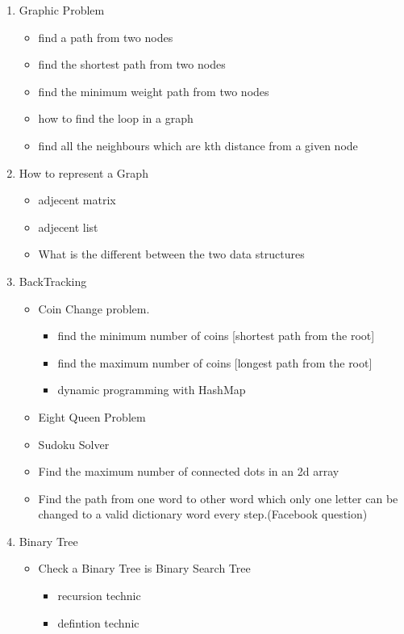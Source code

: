 \documentclass{article}
\begin{document}
\begin{enumerate}
\begin{itemize}
    \end{itemize}

\item Graphic Problem
\begin{itemize}
 \item find a path from two nodes 
 \item find the shortest path from two nodes
 \item find the minimum weight path from two nodes
 \item how to find the loop in a graph
 \item find all the neighbours which are kth distance from a given node
\end{itemize}

\item How to represent a Graph
\begin{itemize}
 \item adjecent matrix 
 \item adjecent list
 \item What is the different between the two data structures
\end{itemize}

\item BackTracking
    \begin{itemize}
     \item Coin Change problem.
     \begin{itemize}
      \item find the minimum number of coins [shortest path from the root]
      \item find the maximum number of coins [longest path from the root]
      \item dynamic programming with HashMap 
     \end{itemize}
     \item Eight Queen Problem
     \item Sudoku Solver
     \item Find the maximum number of connected dots in an 2d array 
     \item Find the path from one word to other word which only one letter can be changed to a valid dictionary word every step.(Facebook question) 
    
    \end{itemize}

\item Binary Tree
    \begin{itemize}
    \item Check a Binary Tree is Binary Search Tree 
    \begin{itemize}
     \item recursion technic
     \item defintion technic 
    \end{itemize}


\end{itemize}
\end{enumerate}
\end{document}
